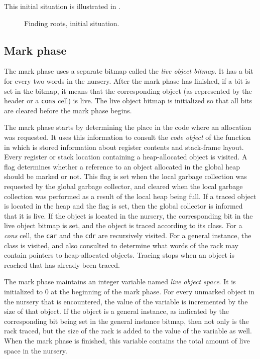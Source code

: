 This initial situation is illustrated in
.

\begin{figure}
\begin{center}
\end{center}
\caption{\label{fig-root-finding-example-1}
Finding roots, initial situation.}
\end{figure}


\subsection{Mark phase}

The mark phase uses a separate bitmap called the \emph{live object
  bitmap}.  It has a bit for every two words in the nursery.  After
the mark phase has finished, if a bit is set in the bitmap, it means
that the corresponding object (as represented by the header or a
\texttt{cons} cell) is live.  The live object bitmap is initialized so
that all bits are cleared before the mark phase begins.

The mark phase starts by determining the place in the code where an
allocation was requested.  It uses this information to consult the
\emph{code object} of the function in which is stored information
about register contents and stack-frame layout. Every register or
stack location containing a heap-allocated object is visited.  A flag
determines whether a reference to an object allocated in the global
heap should be marked or not.  This flag is set when the local garbage
collection was requested by the global garbage collector, and cleared
when the local garbage collection was performed as a result of the
local heap being full.  If a traced object is located in the heap and
the flag is set, then the global collector is informed that it is
live.  If the object is located in the nursery, the corresponding bit
in the live object bitmap is set, and the object is traced according
to its class.  For a \emph{cons} cell, the \texttt{car} and the
\texttt{cdr} are recursively visited.  For a general instance, the
class is visited, and also consulted to determine what words of the
rack may contain pointers to heap-allocated objects.  Tracing stops
when an object is reached that has already been traced.

The mark phase maintains an integer variable named \emph{live object
  space}.  It is initialized to $0$ at the beginning of the mark
phase.  For every unmarked object in the nursery that is encountered,
the value of the variable is incremented by the size of that object.
If the object is a general instance, as indicated by the corresponding
bit being set in the general instance bitmap, then not only is the
rack traced, but the size of the rack is added to the value of the
variable as well.  When the mark phase is finished, this variable
contains the total amount of live space in the nursery.

